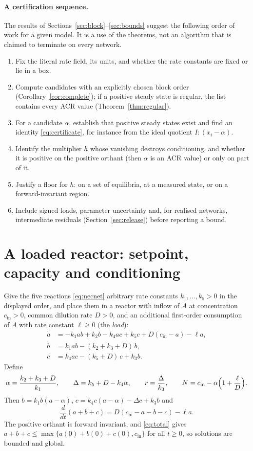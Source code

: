 \documentclass[11pt,a4paper]{article}
\theoremstyle{plain}
\theoremstyle{definition}
\theoremstyle{remark}
\newcommand{\cin}{c_{\mathrm{in}}}
\begin{document}
\paragraph{A certification sequence.}
The results of Sections~\ref{sec:block}--\ref{sec:bounds} suggest the following order of work for a given model. It is a use of the theorems, not an algorithm that is claimed to terminate on every network.
\begin{enumerate}[label=\arabic*.]
\item Fix the literal rate field, its units, and whether the rate constants are fixed or lie in a box.
\item Compute candidates with an explicitly chosen block order (Corollary~\ref{cor:complete}); if a positive steady state is regular, the list contains every ACR value (Theorem~\ref{thm:regular}).
\item For a candidate $\alpha$, establish that positive steady states exist and find an identity \eqref{eq:certificate}, for instance from the ideal quotient $I:(x_i-\alpha)$.
\item Identify the multiplier $h$ whose vanishing destroys conditioning, and whether it is positive on the positive orthant (then $\alpha$ is an ACR value) or only on part of it.
\item Justify a floor for $h$: on a set of equilibria, at a measured state, or on a forward-invariant region.
\item Include signed loads, parameter uncertainty and, for realised networks, intermediate residuals (Section~\ref{sec:release}) before reporting a bound.
\end{enumerate}

\section{A loaded reactor: setpoint, capacity and conditioning}\label{sec:reactor}

Give the five reactions \eqref{eq:necnet} arbitrary rate constants $k_1,\dots,k_5>0$ in the displayed order, and place them in a reactor with inflow of $A$ at concentration $\cin>0$, common dilution rate $D>0$, and an additional first-order consumption of $A$ with rate constant $\ell\ge0$ (the \emph{load}):
\begin{equation}\label{eq:reactor}
\begin{aligned}
 \dot a&=-k_1ab+k_2b-k_4ac+k_5c+D(\cin-a)-\ell a,\\
 \dot b&=k_1ab-(k_2+k_3+D)\,b,\\
 \dot c&=k_4ac-(k_5+D)\,c+k_3b .
\end{aligned}
\end{equation}
Define
\[
  \alpha=\frac{k_2+k_3+D}{k_1},\qquad \Delta=k_5+D-k_4\alpha,\qquad r=\frac{\Delta}{k_3},\qquad N=\cin-\alpha\Bigl(1+\frac{\ell}{D}\Bigr).
\]
Then $\dot b=k_1b(a-\alpha)$, $\dot c=k_4c(a-\alpha)-\Delta c+k_3b$ and
\begin{equation}\label{eq:total}
  \frac{d}{dt}(a+b+c)=D(\cin-a-b-c)-\ell a .
\end{equation}
The positive orthant is forward invariant, and \eqref{eq:total} gives $a+b+c\le\max\{a(0)+b(0)+c(0),\cin\}$ for all $t\ge0$, so solutions are bounded and global.
\end{document}
